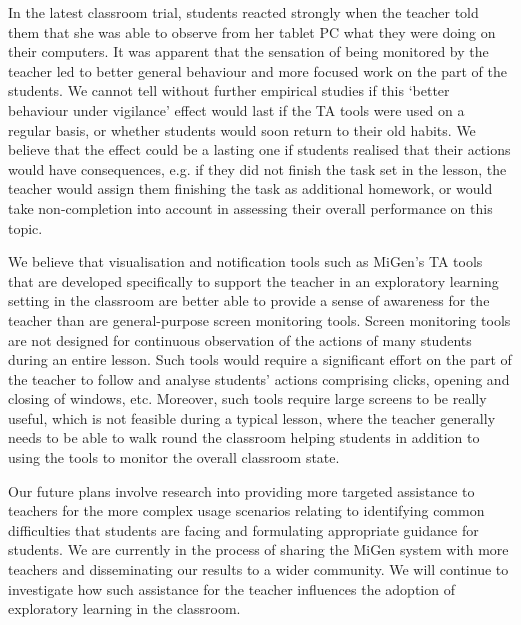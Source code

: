 In the latest classroom trial, students reacted strongly when the teacher 
told them that she was able to observe from her tablet PC what they were 
doing on their computers. %
It was apparent that the sensation of being monitored by the teacher 
led to better general behaviour and more focused work on the part of 
the students. 
We cannot tell without further empirical studies if this 
`better behaviour under vigilance' effect 
would last if the TA tools were used on a regular basis, or whether
students would soon return to their old habits. 
We believe that the effect could be a lasting one if students realised that their
actions would have consequences, e.g. if they did not finish
the task set in the lesson, the teacher would assign them finishing the task
as additional homework, or would take non-completion into account in assessing
their overall performance on this topic. 

We believe that visualisation and notification tools such as MiGen's TA tools 
that are developed specifically to support the teacher in an exploratory learning setting 
in the classroom are better able to provide a sense of awareness for the teacher 
than are general-purpose screen monitoring tools.
Screen monitoring tools are not designed for continuous observation 
of the actions of many students during an entire lesson. 
Such tools would require a significant effort
on the part of the teacher to follow and analyse students' actions
comprising clicks, opening and closing of windows, etc. Moreover, such
tools require large screens to be really useful, which is not feasible
during a typical lesson, where the teacher generally needs to be able
to walk round the classroom helping students in addition to using the
tools to monitor the overall classroom state. 

Our future plans involve research into providing more targeted 
assistance to teachers for the more complex usage scenarios relating to
identifying common difficulties that students are facing and
formulating appropriate guidance for students. We are currently in the
process of sharing the MiGen system with more teachers and
disseminating our results to a wider community. We will continue 
to investigate how such assistance for the teacher
influences the adoption of exploratory learning in the classroom. 

